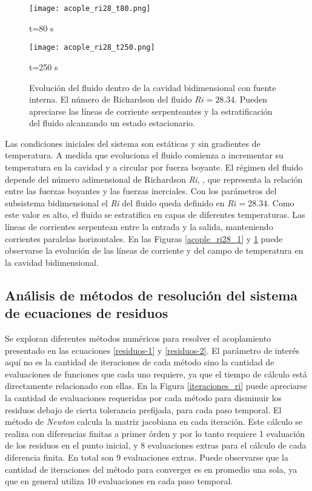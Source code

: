 \begin{figure}[ht]
	\begin{minipage}{0.5\linewidth}
		\centering
		\texttt{[image: acople\_ri28\_t80.png]}
		\caption[]{t=80 s}
		\label{asd}	
	\end{minipage}
	\begin{minipage}{0.5\linewidth}
		\centering
		\texttt{[image: acople\_ri28\_t250.png]}
		\caption[]{t=250 s}
		\label{asd}	
	\end{minipage}
	\caption[Evolución hacia el estado estacionario del fluido dentro de la cavidad bidimensional con fuente interna]
  {Evolución del fluido dentro de la cavidad bidimensional con fuente interna.
	El número de Richardson del fluido $Ri=28.34$.
	Pueden apreciarse las líneas de corriente serpenteantes y la estratificación del fluido alcanzando un estado estacionario.}  
	\label{acople_ri28_2}
\end{figure}

Las condiciones iniciales del sistema son estáticas y sin gradientes de temperatura.
A medida que evoluciona el fluido comienza a incrementar su temperatura en la cavidad y a circular por fuerza boyante.
El régimen del fluido depende del número adimensional de Richardson \textit{Ri}, \cite{richardson},
que representa la relación entre las fuerzas boyantes y las fuerzas inerciales.
Con los parámetros del subsistema bidimensional el \textit{Ri} del fluido queda definido en $Ri=28.34$.
Como este valor es alto, el fluido se estratifica en capas de diferentes temperaturas.
Las líneas de corrientes serpentean entre la entrada y la salida, manteniendo corrientes paralelas horizontales.
En las Figuras \ref{acople_ri28_1} y \ref{acople_ri28_2} puede observarse 
la evolución de las líneas de corriente y del campo de temperatura en la cavidad bidimensional.

\subsection*{Análisis de métodos de resolución del sistema de ecuaciones de residuos}

Se exploran diferentes métodos numéricos para resolver el acoplamiento presentado en las ecuaciones \ref{residuos-1} y \ref{residuos-2}.
El parámetro de interés aquí no es la cantidad de iteraciones de cada método sino la cantidad de evaluaciones de funciones que cada uno requiere,
ya que el tiempo de cálculo está directamente relacionado con ellas.
En la Figura \ref{iteraciones_ri} puede apreciarse la cantidad de evaluaciones requeridas 
por cada método para disminuir los residuos debajo de cierta tolerancia prefijada, para cada paso temporal.
El método de \textit{Newton} calcula la matriz jacobiana en cada iteración.
Este cálculo se realiza con diferencias finitas a primer órden y por lo tanto requiere 1 evaluación de los residuos en el punto inicial,
y 8 evaluaciones extras para el cálculo de cada diferencia finita.
En total son 9 evaluaciones extras.
Puede observarse que la cantidad de iteraciones del método para converger es en promedio una sola, ya que en general utiliza 10 evaluaciones en cada paso temporal.

